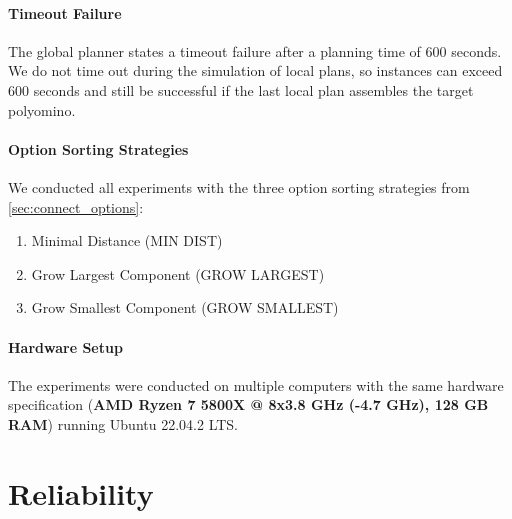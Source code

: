 \paragraph{Timeout Failure}
The global planner states a timeout failure after a planning time of $600$ seconds.
We do not time out during the simulation of local plans, so instances can exceed $600$ seconds and still be successful if the last local plan assembles the target polyomino.

\paragraph{Option Sorting Strategies}
We conducted all experiments with the three option sorting strategies from \autoref{sec:connect_options}:
\begin{enumerate}
	\item Minimal Distance (MIN DIST)
	\item Grow Largest Component (GROW LARGEST)
	\item Grow Smallest Component (GROW SMALLEST)
\end{enumerate}

\paragraph{Hardware Setup}
The experiments were conducted on multiple computers with the same hardware specification (\textbf{AMD Ryzen 7 5800X @ 8x3.8 GHz (-4.7 GHz), 128 GB RAM}) running Ubuntu 22.04.2 LTS.



\section{Reliability}
\label{sec:AR}

